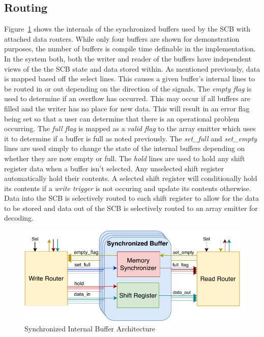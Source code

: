     \subsection{Routing}
        Figure~\ref{fig:sb_arch} shows the internals of the synchronized buffers used by the SCB with attached data routers. While only four buffers are shown for demonstration purposes, the number of buffers is compile time definable in the implementation. In the system both, both the writer and reader of the buffers have independent views of the the SCB state and data stored within. As mentioned previously, data is mapped based off the select lines. This causes a given buffer's internal lines to be routed in or out depending on the direction of the signals. The {\it empty flag} is used to determine if an overflow has occurred. This may occur if all buffers are filled and the writer has no place for new data. This will result in an error flag being set so that a user can determine that there is an operational problem occurring. The {\it full flag} is mapped as a {\it valid flag} to the array emitter which uses it to determine if a buffer is full as noted previously. The {\it set\_full} and {\it set\_empty} lines are used simply to change the state of the internal buffers depending on whether they are now empty or full. The {\it hold} lines are used to hold any shift register data when a buffer isn't selected. Any unselected shift register automatically hold their contents. A selected shift register will conditionally hold its contents if a {\it write trigger} is not occuring and update its contents otherwise. Data into the SCB is selectively routed to each shift register to allow for the data to be stored and data out of the SCB is selectively routed to an array emitter for decoding.

        \begin{figure}
            \centering
            \includegraphics[width=1.0\textwidth]{fig/pdp_sb_arch.pdf}
            \caption{Synchronized Internal Buffer Architecture}
            \label{fig:sb_arch}
        \end{figure}

